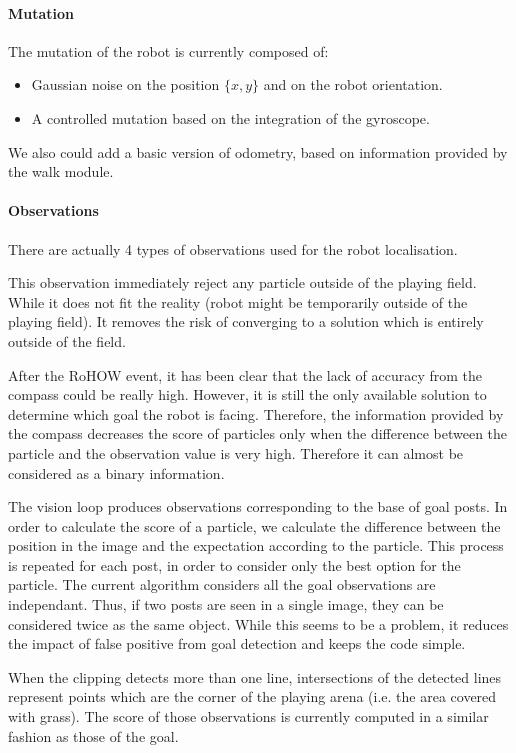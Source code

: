 \documentclass[a4paper,12pt]{article}
\begin{document}
\paragraph{Mutation}
The mutation of the robot is currently composed of:
\begin{itemize}
  \item Gaussian noise on the position $\{x,y\}$ and on the robot orientation.
  \item A controlled mutation based on the integration of the gyroscope.
\end{itemize}
We also could add a basic version of odometry, based on information provided
by the walk module.

\paragraph{Observations}
There are actually 4 types of observations used for the robot localisation.
\begin{description}[labelindent=1cm, leftmargin=4.5cm, style=sameline]
\item[Field:] This observation immediately reject any particle outside of the
  playing field. While it does not fit the reality (robot might be temporarily
  outside of the playing field). It removes the risk of converging to a solution
  which is entirely outside of the field.
\item[Compass:] After the RoHOW event, it has been clear that the lack of
  accuracy from the compass could be really high. However, it is still the
  only available solution to determine which goal the robot is facing.
  Therefore, the information provided by the compass decreases the score of
  particles only when the difference between the particle and the observation
  value is very high. Therefore it can almost be considered as a binary
  information.
\item[Goal:] The vision loop produces observations corresponding to the base of
  goal posts. In order to calculate the score of a particle, we calculate the
  difference between the position in the image and the expectation according to
  the particle. This process is repeated for each post, in order to
  consider only the best option for the particle. The current algorithm considers
  all the goal observations are independant. Thus, if two posts are seen in a
  single image, they can be considered twice as the same object. While this
  seems to be a problem, it reduces the impact of false positive from goal
  detection and keeps the code simple.
\item[ArenaCorners:] When the clipping detects more than one line, intersections
  of the detected lines represent points which are the corner of the playing
  arena (i.e. the area covered with grass). The score of those observations is
  currently computed in a similar fashion as those of the goal.
\end{description}
\end{document}
